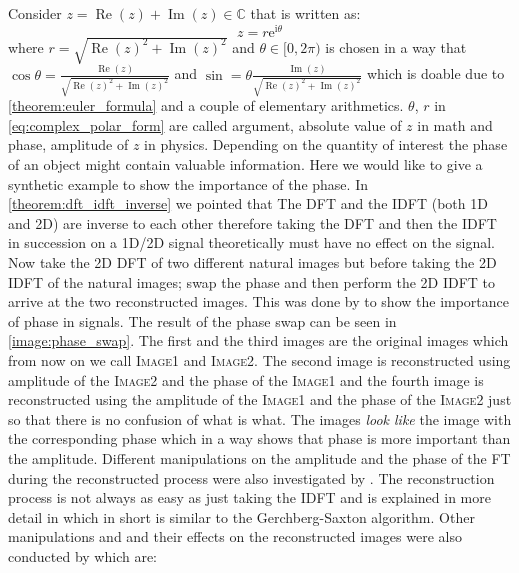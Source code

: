 Consider  $z= \operatorname{Re}(z)+\operatorname{Im}(z) \in \mathbb{C}$ that is written as:
\begin{equation}\label{eq:complex_polar_form}
  z = r \mathrm{e}^ {\mathrm{i}\theta}
\end{equation}
where $r = \sqrt{\operatorname{Re}(z)^2+\operatorname{Im}(z)^2}$ and $\theta \in [0,2\pi)$ is chosen in a way that 
$\cos \theta = \frac{\operatorname{Re}(z)}{\sqrt{\operatorname{Re}(z)^2+\operatorname{Im}(z)^2}}$ and 
$\sin = \theta \frac{\operatorname{Im}(z)}{\sqrt{\operatorname{Re}(z)^2+\operatorname{Im}(z)^2}}$ 
which is doable due to \cref{theorem:euler_formula} and a couple of elementary arithmetics. $\theta$, $r$ in \cref{eq:complex_polar_form} are called 
argument, absolute value of $z$ in math and phase, amplitude of $z$ in physics. Depending on the quantity of interest the phase of an object 
might contain valuable information. Here we would like to give a synthetic example to show the importance of the phase. In \cref{theorem:dft_idft_inverse} 
we pointed that The \ac{DFT} and the \ac{IDFT} (both 1D and 2D) are inverse to each other therefore taking the \ac{DFT} and then the \ac{IDFT} in 
succession on a 1D/2D signal theoretically must have no effect on the signal. Now take the 2D \ac{DFT} of two different natural images but 
before taking the 2D \ac{IDFT} of the natural images; swap the phase and then perform the 2D \ac{IDFT} to arrive at the two reconstructed images. This 
was done by \cite{Oppenheim1981} to show the importance of phase in signals. The result of the phase swap can be seen in \cref{image:phase_swap}. 
The first and the third images are the original images which from now on we call \textsc{Image1} and \textsc{Image2}. 
The second image is reconstructed using amplitude of the \textsc{Image2} and the phase of the \textsc{Image1} and the fourth image is reconstructed using 
the amplitude of the \textsc{Image1} and the phase of the \textsc{Image2} just so that there is no confusion of what is what. The images 
\emph{look like} the image with the corresponding phase which in a way shows that phase is more important than the amplitude. Different manipulations 
on the amplitude and the phase of the \ac{FT} during the reconstructed process 
 were also investigated by \cite{Oppenheim1981}. The reconstruction process is not always as easy as just taking the \ac{IDFT} and 
 is explained in more detail in \cite{Oppenheim1979} which in short is similar to the Gerchberg-Saxton algorithm\cite{Gerchberg1972}. 
 Other manipulations and and their effects on the reconstructed images were also conducted by \cite{Oppenheim1981} which are:
